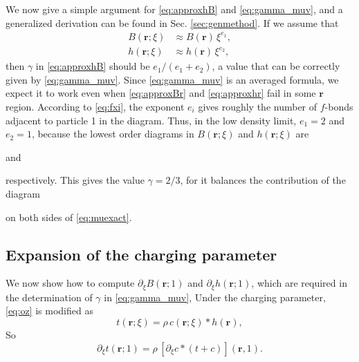 \documentclass[aip,jcp,reprint,superscriptaddress]{revtex4-1}
\newcommand{\vct}[1]{\mathbf{#1}}
\providecommand{\vr}{} %
\renewcommand{\vr}{\vct{r}}
\begin{document}
We now give a simple argument for \eqref{eq:approxhB} and \eqref{eq:gamma_muv},
and a generalized derivation can be found in Sec. \ref{sec:genmethod}.
%
If we assume that
\begin{align}
  B(\vr; \xi) &\approx B(\vr) \,  \xi^{e_1},
  \label{eq:approxBr} \\
  h(\vr; \xi) &\approx h(\vr) \, \xi^{e_2},
  \label{eq:approxhr}
\end{align}
then $\gamma$ in \eqref{eq:approxhB} should be $e_1/(e_1 + e_2)$,
a value that can be correctly given by \eqref{eq:gamma_muv}.
%
Since \eqref{eq:gamma_muv} is an averaged formula,
we expect it to work even when \eqref{eq:approxBr} and \eqref{eq:approxhr}
fail in some $\vr$ region.
%
According to \eqref{eq:fxi},
the exponent $e_i$ gives roughly the number of $f$-bonds
adjacent to particle 1 in the diagram.
%
Thus, in the low density limit,
$e_1 = 2$ and $e_2 = 1$,
because the lowest order diagrams in
$B(\vr; \xi)$ and $h(\vr; \xi)$
are
and
respectively.
%
This gives the value $\gamma = 2/3$,
for it balances the contribution of the diagram
on both sides of \eqref{eq:muexact}.



\subsection{\label{sec:dxi}Expansion of the charging parameter}


We now show how to compute $\partial_\xi B(\vr; 1)$ and $\partial_\xi h(\vr; 1)$,
which are required in the determination of $\gamma$ in \eqref{eq:gamma_muv},
%
Under the charging parameter, \eqref{eq:oz} is modified as
\[
  t(\vr; \xi) = \rho \, c(\vr; \xi) * h(\vr),
\]
So
\begin{equation}
  \partial_\xi t(\vr; 1)
  = \rho \, [\partial_\xi c * (t + c)](\vr, 1).
  \label{eq:ozxi}
\end{equation}
\end{document}
